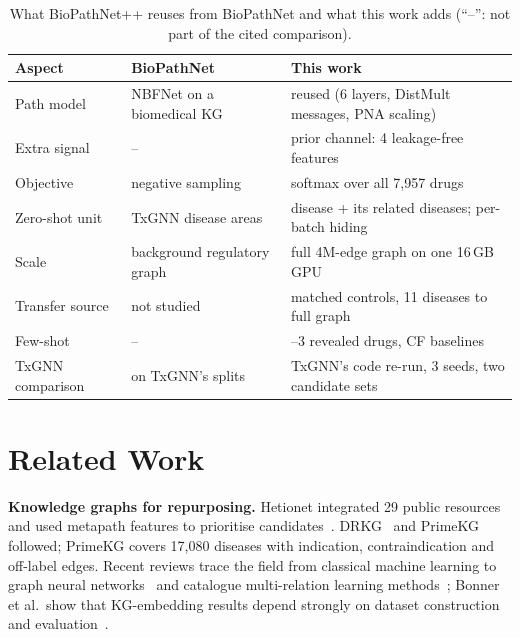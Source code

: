 \documentclass{ieeeaccess}
\newcommand{\sysname}{BioPathNet++\xspace}
\begin{document}
\begin{table}[!t]
\centering
\caption{What \sysname reuses from BioPathNet and what this work adds (``--'': not part of the cited comparison).}
\label{tab:novelty}
\scriptsize
\setlength{\tabcolsep}{3pt}
\begin{tabular}{>{\raggedright\arraybackslash}p{1.75cm}>{\raggedright\arraybackslash}p{2.35cm}>{\raggedright\arraybackslash}p{3.7cm}}
\toprule
Aspect & BioPathNet~\cite{hu2026biopathnet} & This work \\
\midrule
Path model & NBFNet on a biomedical KG & reused (6 layers, DistMult messages, PNA scaling) \\
Extra signal & -- & prior channel: 4 leakage-free features \\
Objective & negative sampling & softmax over all 7,957 drugs \\
Zero-shot unit & TxGNN disease areas & disease + its related diseases; per-batch hiding \\
Scale & background regulatory graph & full 4M-edge graph on one 16\,GB GPU \\
Transfer source & not studied & matched controls, 11 diseases to full graph \\
Few-shot & -- & 1--3 revealed drugs, CF baselines \\
TxGNN comparison & on TxGNN's splits & TxGNN's code re-run, 3 seeds, two candidate sets \\
\bottomrule
\end{tabular}
\end{table}

\section{Related Work}
\label{sec:related}
\textbf{Knowledge graphs for repurposing.} Hetionet integrated 29 public resources and used metapath features to prioritise candidates~\cite{himmelstein2017hetionet}. DRKG~\cite{drkg2020} and PrimeKG~\cite{chandak2023primekg} followed; PrimeKG covers 17,080 diseases with indication, contraindication and off-label edges. Recent reviews trace the field from classical machine learning to graph neural networks~\cite{wei2025kgreview} and catalogue multi-relation learning methods~\cite{kumar2025scoping}; Bonner et al.\ show that KG-embedding results depend strongly on dataset construction and evaluation~\cite{bonner2022review,bonner2022kge}.
\end{document}
